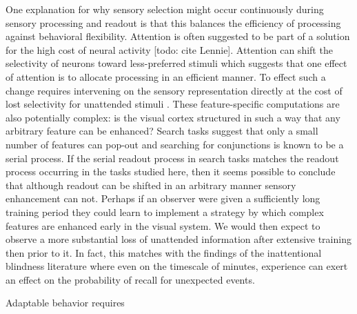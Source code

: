 One explanation for why sensory selection might occur continuously during sensory processing and readout is that this balances the efficiency of processing against behavioral flexibility. Attention is often suggested to be part of a solution for the high cost of neural activity [todo: cite Lennie]. Attention can shift the selectivity of neurons toward less-preferred stimuli which suggests that one effect of attention is to allocate processing in an efficient manner. To effect such a change requires intervening on the sensory representation directly at the cost of lost selectivity for unattended stimuli \citep{Mack1998-nq}. These feature-specific computations are also potentially complex: is the visual cortex structured in such a way that any arbitrary feature can be enhanced? Search tasks suggest that only a small number of features can pop-out \citep{Wolfe1994-ew} and searching for conjunctions is known to be a serial process. If the serial readout process in search tasks matches the readout process occurring in the tasks studied here, then it seems possible to conclude that although readout can be shifted in an arbitrary manner sensory enhancement can not. Perhaps if an observer were given a sufficiently long training period they could learn to implement a strategy by which complex features are enhanced early in the visual system. We would then expect to observe a more substantial loss of unattended information after extensive training then prior to it. In fact, this matches with the findings of the inattentional blindness literature \citep{Mack1998-nq,Mack2015-sq} where even on the timescale of minutes, experience can exert an effect on the probability of recall for unexpected events.

Adaptable behavior requires 


